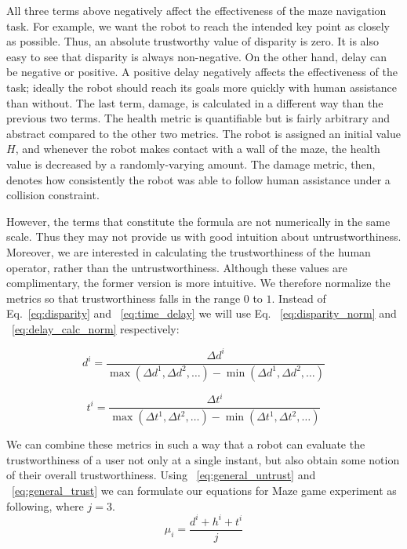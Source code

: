 \documentclass{sig-alternate}
\begin{document}
All three terms above negatively affect the effectiveness of the maze navigation task. For example, we want the robot to reach the intended key point as closely as possible. Thus, an absolute trustworthy value of disparity is zero. It is also easy to see that disparity is always non-negative.  On the other hand, delay can be negative or positive. A positive delay negatively affects the effectiveness of the task; ideally the robot should reach its goals more quickly with human assistance than without. The last term, damage, is calculated in a
different way than the previous two terms. The health metric is
quantifiable but is fairly arbitrary and abstract compared to the
other two metrics. The robot is assigned an initial value $H$, and
whenever the robot makes contact with a wall of the maze, the health
value is decreased by a randomly-varying amount.  The damage metric,
then, denotes how consistently the robot was able to follow human
assistance under a collision constraint.


However, the terms that constitute the formula are not numerically in the same scale.  Thus they may not provide us with good intuition about untrustworthiness. Moreover, we are interested in calculating the trustworthiness of the human operator, rather than the untrustworthiness. Although these values are complimentary, the former version is more intuitive.  We therefore normalize the metrics so that trustworthiness falls in the range $0$ to $1$. Instead of Eq.~\ref{eq:disparity} and ~\ref{eq:time_delay} we will use Eq. ~\ref{eq:disparity_norm} and ~\ref{eq:delay_calc_norm} respectively:

\begin{equation}
  \label{eq:disparity_norm}
  d^i = \dfrac{\Delta d^i}{\max(\Delta d^1,\Delta d^2, \ldots) - \min(\Delta d^1,\Delta d^2, \ldots)}
\end{equation}

 
\begin{equation}
  \label{eq:delay_calc_norm}
    t^i = \dfrac{\Delta t^i}{\max(\Delta t^1,\Delta t^2, \ldots) - \min(\Delta t^1,\Delta t^2, \ldots)}
\end{equation}

We can combine these metrics in such a way that a robot can evaluate
the trustworthiness of a user not only at a single instant, but also
obtain some notion of their overall trustworthiness. Using ~\ref{eq:general_untrust} and ~\ref{eq:general_trust} we can formulate our equations for Maze game experiment as following, where $j = 3$.
  \begin{equation}
  \label{eq:mistrust}
  \mu_i=\dfrac{d^i+h^i+t^i}{j}
  \end{equation}
  
\end{document}
